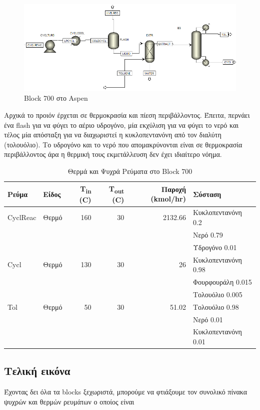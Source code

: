 \documentclass[11pt]{article}
\begin{document}
\begin{figure}[htbp]
\centering
\includegraphics[width=.9\linewidth]{Block_700_-_Καθαρισμός_της_Κυκλοπεντανόνης/2023-03-17_18-13-36_screenshot.png}
\caption{Block 700 στο Aspen}
\end{figure}

Αρχικά το προιόν έρχεται σε θερμοκρασία και πίεση περιβάλλοντος. Έπειτα, περνάει ένα flash για να φύγει το αέριο υδρογόνο, μία εκχύλιση για να φύγει το νερό και τέλος μία απόσταξη για να διαχωριστεί η κυκλοπεντανόνη από τον διαλύτη (τολουόλιο). Το υδρογόνο και το νερό που απομακρύνονται είναι σε θερμοκρασία περιβάλλοντος άρα η θερμική τους εκμετάλλευση δεν έχει ιδιαίτερο νόημα.

\begin{table}[htbp]
\caption{Θερμά και Ψυχρά Ρεύματα στο Block 700}
\centering
\begin{tabular}{llrrrl}
Ρεύμα & Είδος & Τ\textsubscript{in} (C) & Τ\textsubscript{out} (C) & Παροχή (kmol/hr) & Σύσταση\\
\hline
CyclReac & Θερμό & 160 & 30 & 2132.66 & Κυκλοπεντανόνη 0.2\\
 &  &  &  &  & Νερό 0.79\\
 &  &  &  &  & Υδρογόνο 0.01\\
\hline
Cycl & Θερμό & 130 & 30 & 26 & Κυκλοπεντανόνη 0.98\\
 &  &  &  &  & Φουρφουράλη 0.015\\
 &  &  &  &  & Τολουόλιο 0.005\\
\hline
Tol & Θερμό & 50 & 30 & 51.02 & Τολουόλιο 0.98\\
 &  &  &  &  & Νερό 0.01\\
 &  &  &  &  & Κυκλοπεντανόνη 0.01\\
\hline
\end{tabular}
\end{table}

\subsection{Τελική εικόνα}
\label{sec:orgd89ec83}
Έχοντας δει όλα τα blocks ξεχωριστά, μπορούμε να φτιάξουμε τον συνολικό πίνακα ψυχρών και θερμών ρευμάτων ο οποίος είναι
\end{document}
